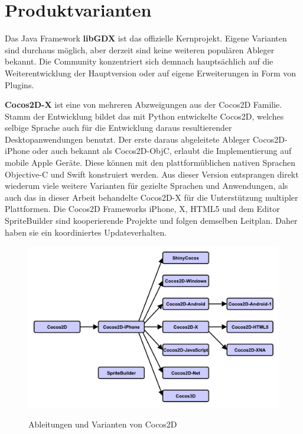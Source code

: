 \section{Produktvarianten}
Das Java Framework \textbf{libGDX} ist das offizielle Kernprojekt. Eigene Varianten sind durchaus möglich, aber derzeit sind keine weiteren populären Ableger bekannt. Die Community konzentriert sich demnach hauptsächlich auf die Weiterentwicklung der Hauptversion oder auf eigene Erweiterungen in Form von Plugins.

\bigskip
\textbf{Cocos2D-X} ist eine von mehreren Abzweigungen aus der Cocos2D Familie. Stamm der Entwicklung bildet das mit Python entwickelte Cocos2D, welches selbige Sprache auch für die Entwicklung daraus resultierender Desktopanwendungen benutzt. Der erste daraus abgeleitete Ableger Cocos2D-iPhone oder auch bekannt als Cocos2D-ObjC, erlaubt die Implementierung auf mobile Apple Geräte. Diese können mit den plattformüblichen nativen Sprachen Objective-C und Swift konstruiert werden. Aus dieser Version entsprangen direkt wiederum viele weitere Varianten für gezielte Sprachen und Anwendungen, als auch das in dieser Arbeit behandelte Cocos2D-X für die Unterstützung multipler Plattformen. Die Cocos2D Frameworks iPhone, X, HTML5 und dem Editor SpriteBuilder sind kooperierende Projekte und folgen demselben Leitplan. Daher haben sie ein koordiniertes Updateverhalten. \citep{cocos2d_relationships}

\begin{figure}[htbp]
	\centering
	\includegraphics[width=1\textwidth]{Bilder/Cocos2d_Relationships}
	\caption{Ableitungen und Varianten von Cocos2D}\label{graph_Cocos2d_Relationships}\citep{cocos2d_relationships}
\end{figure}

